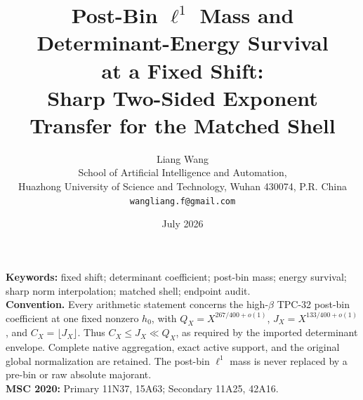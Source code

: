 \documentclass[11pt]{article}
\title{Post-Bin \(\ell^1\) Mass and Determinant-Energy Survival\\
at a Fixed Shift:\\
Sharp Two-Sided Exponent Transfer for the Matched Shell}
\author{Liang Wang\\
School of Artificial Intelligence and Automation,\\
Huazhong University of Science and Technology, Wuhan 430074, P.R. China\\
\texttt{wangliang.f@gmail.com}}
\date{July 2026}
\theoremstyle{remark}
\begin{document}
\maketitle


\noindent\textbf{Keywords:} fixed shift; determinant coefficient;
post-bin mass; energy survival; sharp norm interpolation; matched
shell; endpoint audit.\\[0.5em]
\noindent\textbf{Convention.} Every arithmetic statement concerns
the high-\(\beta\) TPC-32 post-bin coefficient at one fixed nonzero
\(h_0\), with
\(Q_X=X^{267/400+o(1)}\),
\(J_X=X^{133/400+o(1)}\), and
\(C_X=\lfloor J_X\rfloor\).  Thus \(C_X\le J_X\ll Q_X\), as required
by the imported determinant envelope.  Complete native aggregation,
exact active support, and the original global normalization are
retained.  The post-bin \(\ell^1\) mass is never replaced by a
pre-bin or raw absolute majorant.\\[0.5em]
\noindent\textbf{MSC 2020:} Primary 11N37, 15A63; Secondary 11A25,
42A16.










\begingroup
\small
\raggedright


\endgroup
\end{document}
